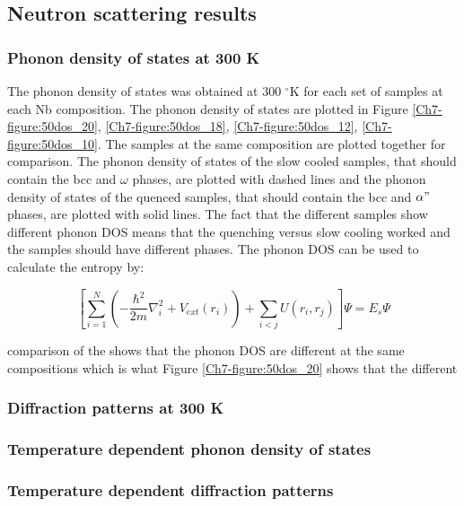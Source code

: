 \subsection{Neutron scattering results}

\subsubsection{Phonon density of states at 300 K}

The phonon density of states was obtained at 300 $^\circ$K for each set of samples at each Nb composition. The phonon density of states are plotted in Figure \ref{Ch7-figure:50dos_20}, \ref{Ch7-figure:50dos_18}, \ref{Ch7-figure:50dos_12}, \ref{Ch7-figure:50dos_10}. The samples at the same composition are plotted together for comparison. The phonon density of states of the slow cooled samples, that should contain the bcc and $\omega$ phases, are plotted with dashed lines and the phonon density of states of the quenced samples, that should contain the bcc and $\alpha "$ phases, are plotted with solid lines. The fact that the different samples show different phonon DOS means that the quenching versus slow cooling worked and the samples should have different phases. The phonon DOS can be used to calculate the entropy by:

\begin{equation}
\label{eq:phononentropy}
\left[ \sum_{i=1}^{N} \left( - \frac{\hbar^2}{2m} \nabla_{i}^2 + V_{ext} (r_{i}) \right) + \sum_{i<j} U (r_{i}, r_{j}) \right] \Psi = E_{s} \Psi
\end{equation}

comparison of the shows that the phonon DOS are different at the same compositions which is what Figure \ref{Ch7-figure:50dos_20} shows that the different 

\subsubsection{Diffraction patterns at 300 K}

\subsubsection{Temperature dependent phonon density of states }

\subsubsection{Temperature dependent diffraction patterns}

